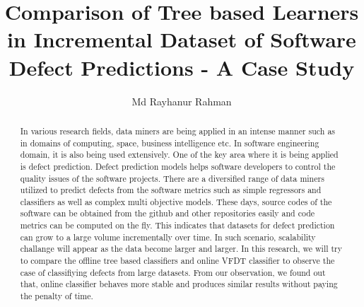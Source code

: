 \documentclass[sigplan]{acmart}\settopmatter{printfolios=true,printccs=false,printacmref=false}
\begin{document}
\title[Comparison of Tree based Learners in Incremental Dataset of Software Defect Predictions - A Case Study]{Comparison of Tree based Learners in Incremental Dataset of Software Defect Predictions - A Case Study}         
\subtitle{}                    


\author{Md Rayhanur Rahman}



\begin{abstract}
In various research fields, data miners are being applied in an intense manner such as in domains of computing, space, business intelligence etc. In software engineering domain, it is also being used extensively. One of the key area where it is being applied is defect prediction. Defect prediction models helps software developers to control the quality issues of the software projects. There are a diversified range of data miners utilized to predict defects from the software metrics such as simple regressors and classifiers as well as complex multi objective models. These days, source codes of the software can be obtained from the github and other repositories easily and code metrics can be computed on the fly. This indicates that datasets for defect prediction can grow to a large volume incrementally over time. In such scenario, scalability challange will appear as the data become larger and larger. In this research, we will try to compare the offline tree based classifiers and online VFDT classifier to observe the case of classifiying defects from large datasets. From our observation, we found out that, online classifier behaves more stable and produces similar results without paying the penalty of time.  
\end{abstract}


\maketitle
\end{document}
